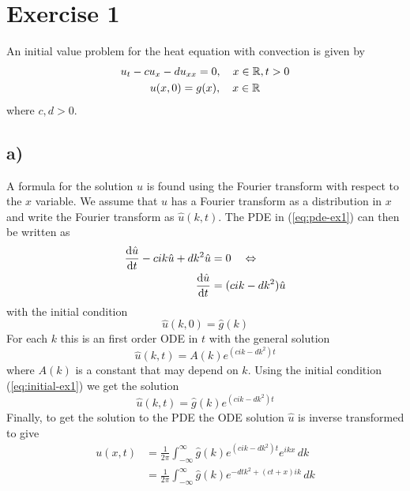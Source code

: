 \def\homeworknumber{5}
\def\homeworkdate{29-11-2011}

\def\umax{u_{\text{max}}}
\def\vmax{v_{\text{max}}}





    \maketitle

    \section*{Exercise 1}
    
    An initial value problem for the heat equation with convection is given by
    \begin{gather}\label{eq:pde-ex1}
        u_t - cu_x - du_{xx} = 0, \quad x\in\mathbb{R}, t>0 \\
        u(x,0) = g(x),\quad x\in\mathbb{R}
    \end{gather}
    where $c,d>0$.

    \subsection*{a)}
    A formula for the solution $u$ is found using the Fourier transform with respect to the $x$ variable. We assume that $u$ has a Fourier transform as a distribution in $x$ and write the Fourier transform as $\hat{u}(k,t)$. The PDE in (\ref{eq:pde-ex1}) can then be written as
    \begin{align*}
        \frac{\text{d}\hat{u}}{\text{d}t} - cik\hat{u} + dk^2\hat{u} &= 0 \quad\Leftrightarrow\quad\\
        \frac{\text{d}\hat{u}}{\text{d}t} &= (cik - dk^2)\hat{u}
    \end{align*}
    with the initial condition
    \begin{equation}\label{eq:initial-ex1}
        \hat{u}(k, 0) = \hat{g}(k)
    \end{equation}
    For each $k$ this is an first order ODE in $t$ with the general solution
    \begin{equation*}
        \hat{u}(k,t) = A(k)e^{(cik - dk^2)t}
    \end{equation*}
    where $A(k)$ is a constant that may depend on $k$. Using the initial condition (\ref{eq:initial-ex1}) we get the solution
    \begin{equation*}
        \hat{u}(k,t) = \hat{g}(k)e^{(cik - dk^2)t}
    \end{equation*}
    Finally, to get the solution to the PDE the ODE solution $\hat{u}$ is inverse transformed to give
    \begin{align*}
        u(x, t) &= \frac{1}{2\pi}\int_{-\infty}^\infty \hat{g}(k)e^{(cik - dk^2)t}e^{ikx}\,dk\\
            &= \frac{1}{2\pi}\int_{-\infty}^\infty \hat{g}(k)e^{-dtk^2+(ct+x)ik}\,dk
    \end{align*}

